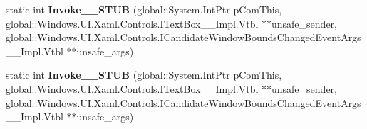 \begin{DoxyCompactItemize}
\mbox{\label{struct_windows_1_1_foundation_1_1_typed_event_handler___a___windows___u_i___xaml___controls___tea8675657ada60f534086508fa4403c3f_a16c64096fc9356d660072d85a9a8e919}} 
static int {\bfseries Invoke\+\_\+\+\_\+\+S\+T\+UB} (global\+::\+System.\+Int\+Ptr p\+Com\+This, global\+::\+Windows.\+U\+I.\+Xaml.\+Controls.\+I\+Text\+Box\+\_\+\+\_\+\+Impl.\+Vtbl $\ast$$\ast$unsafe\+\_\+sender, global\+::\+Windows.\+U\+I.\+Xaml.\+Controls.\+I\+Candidate\+Window\+Bounds\+Changed\+Event\+Args\+\_\+\+\_\+\+Impl.\+Vtbl $\ast$$\ast$unsafe\+\_\+args)
\item 
\mbox{\label{struct_windows_1_1_foundation_1_1_typed_event_handler___a___windows___u_i___xaml___controls___tea8675657ada60f534086508fa4403c3f_a16c64096fc9356d660072d85a9a8e919}} 
static int {\bfseries Invoke\+\_\+\+\_\+\+S\+T\+UB} (global\+::\+System.\+Int\+Ptr p\+Com\+This, global\+::\+Windows.\+U\+I.\+Xaml.\+Controls.\+I\+Text\+Box\+\_\+\+\_\+\+Impl.\+Vtbl $\ast$$\ast$unsafe\+\_\+sender, global\+::\+Windows.\+U\+I.\+Xaml.\+Controls.\+I\+Candidate\+Window\+Bounds\+Changed\+Event\+Args\+\_\+\+\_\+\+Impl.\+Vtbl $\ast$$\ast$unsafe\+\_\+args)
\end{DoxyCompactItemize}
